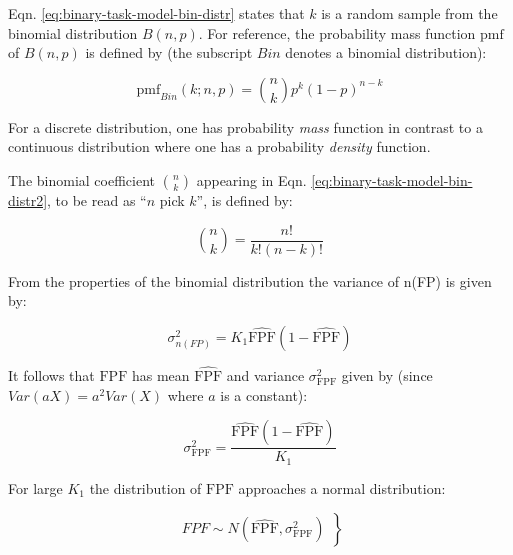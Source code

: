 \documentclass[
]{book}
\begin{document}
Eqn. \eqref{eq:binary-task-model-bin-distr} states that \(k\) is a random sample from the binomial distribution \(B(n,p)\). For reference, the probability mass function \(\text{pmf}\) of \(B(n,p)\) is defined by (the subscript \(Bin\) denotes a binomial distribution):

\begin{equation} 
\text{pmf}_{Bin}\left ( k;n,p \right )=\binom{n}{k}p^k(1-p)^{n-k}
\label{eq:binary-task-model-bin-distr2}
\end{equation}

For a discrete distribution, one has probability \emph{mass} function in contrast to a continuous distribution where one has a probability \emph{density} function.

The binomial coefficient \(\binom{n}{k}\) appearing in Eqn. \eqref{eq:binary-task-model-bin-distr2}, to be read as ``\(n\) pick \(k\)'', is defined by:

\begin{equation} 
\binom{n}{k}=\frac{n!}{k!(n-k)!}
\label{eq:binary-task-model-bin-coeff}
\end{equation}

From the properties of the binomial distribution the variance of n(FP) is given by:

\begin{equation} 
\sigma_{n(FP)}^2=K_1\widehat{\text{FPF}}\left ( 1 - \widehat{\text{FPF}} \right )
\label{eq:binary-task-model-var-n-FP}
\end{equation}

It follows that \(\text{FPF}\) has mean \(\widehat{\text{FPF}}\) and variance \(\sigma_{\text{FPF}}^2\) given by (since \(Var(aX) = a^2 Var(X)\) where \(a\) is a constant):

\begin{equation} 
\sigma_{\text{FPF}}^2 = \frac{\widehat{\text{FPF}}\left ( 1 - \widehat{\text{FPF}} \right )}{K_1}
\label{eq:binary-task-model-var-fpf}
\end{equation}

For large \(K_1\) the distribution of \(\text{FPF}\) approaches a normal distribution:

\begin{equation} 
\left.
\begin{aligned}  
FPF \sim N\left ( \widehat{\text{FPF}}, \sigma_{\text{FPF}}^2 \right )\end{aligned}
\right \}
\label{eq:binary-task-model-distr-fpf}
\end{equation}
\end{document}
